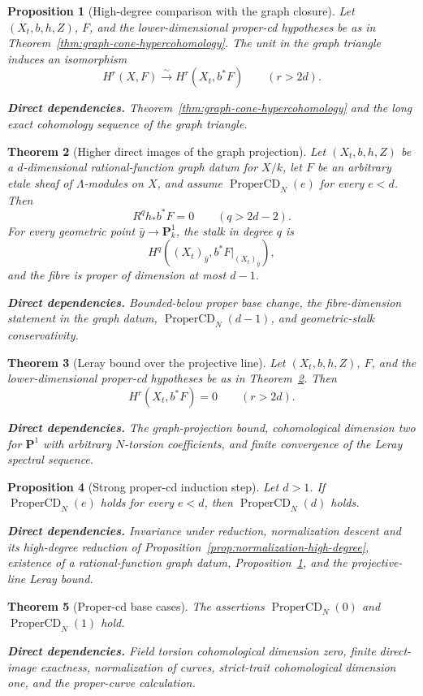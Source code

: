 \documentclass[10pt]{article}
\newtheorem{theorem}{Theorem}[section]
\newtheorem{proposition}[theorem]{Proposition}
\theoremstyle{definition}
\newcommand{\deps}[1]{\par\smallskip\noindent\textbf{Direct dependencies.} #1}
\begin{document}
\begin{proposition}[High-degree comparison with the graph closure]
\label{prop:graph-high-degree-comparison}
Let $(X_t,b,h,Z)$, $F$, and the lower-dimensional proper-cd hypotheses be as
in Theorem~\ref{thm:graph-cone-hypercohomology}.  The unit in the graph
triangle induces an isomorphism
\[
 H^r(X,F)\xrightarrow{\ \sim\ }
 H^r(X_t,b^*F)\qquad(r>2d).
\]
\deps{Theorem~\ref{thm:graph-cone-hypercohomology} and the long exact
cohomology sequence of the graph triangle.}
\end{proposition}

\begin{theorem}[Higher direct images of the graph projection]
\label{thm:graph-projection-bound}
Let $(X_t,b,h,Z)$ be a $d$-dimensional rational-function graph datum for
$X/k$, let $F$ be an arbitrary etale sheaf of $\Lambda$-modules on $X$, and
assume $\operatorname{ProperCD}_N(e)$ for every $e<d$.  Then
\[
 R^qh_*b^*F=0\qquad(q>2d-2).
\]
For every geometric point $\bar y\to\mathbf P^1_k$, the stalk in degree $q$
is
\[
 H^q((X_t)_{\bar y},b^*F|_{(X_t)_{\bar y}}),
\]
and the fibre is proper of dimension at most $d-1$.
\deps{Bounded-below proper base change, the fibre-dimension statement in the
graph datum, $\operatorname{ProperCD}_N(d-1)$, and geometric-stalk
conservativity.}
\end{theorem}

\begin{theorem}[Leray bound over the projective line]
\label{thm:graph-p1-leray}
Let $(X_t,b,h,Z)$, $F$, and the lower-dimensional proper-cd hypotheses be as
in Theorem~\ref{thm:graph-projection-bound}.  Then
\[
 H^r(X_t,b^*F)=0\qquad(r>2d).
\]
\deps{The graph-projection bound, cohomological dimension two for
$\mathbf P^1$ with arbitrary $N$-torsion coefficients, and finite
convergence of the Leray spectral sequence.}
\end{theorem}

\begin{proposition}[Strong proper-cd induction step]
\label{prop:proper-cd-step}
Let $d>1$.  If $\operatorname{ProperCD}_N(e)$ holds for every $e<d$, then
$\operatorname{ProperCD}_N(d)$ holds.
\deps{Invariance under reduction, normalization descent and its
high-degree reduction of Proposition~\ref{prop:normalization-high-degree},
existence of a rational-function graph datum,
Proposition~\ref{prop:graph-high-degree-comparison}, and the projective-line
Leray bound.}
\end{proposition}

\begin{theorem}[Proper-cd base cases]
\label{thm:proper-cd-base}
The assertions $\operatorname{ProperCD}_N(0)$ and
$\operatorname{ProperCD}_N(1)$ hold.
\deps{Field torsion cohomological dimension zero, finite direct-image
exactness, normalization of curves, strict-trait cohomological dimension
one, and the proper-curve calculation.}
\end{theorem}
\end{document}
